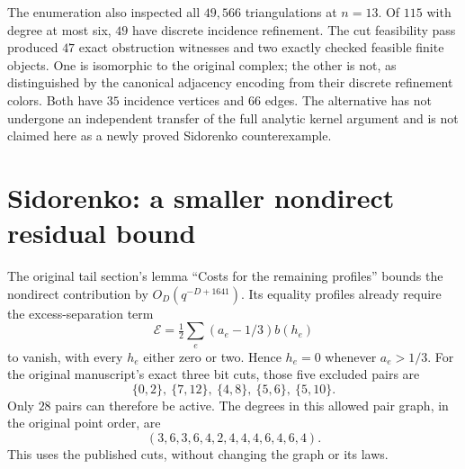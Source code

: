 \documentclass[11pt]{article}
\begin{document}
The enumeration also inspected all $49{,}566$ triangulations at $n=13$.
Of $115$ with degree at most six, $49$ have discrete incidence refinement.
The cut feasibility pass produced $47$ exact obstruction witnesses and
two exactly checked feasible finite objects. One is isomorphic to the
original complex; the other is not, as distinguished by the canonical
adjacency encoding from their discrete refinement colors. Both have
$35$ incidence vertices and $66$ edges. The alternative has not undergone
an independent transfer of the full analytic kernel argument and is not
claimed here as a newly proved Sidorenko counterexample.

\section{Sidorenko: a smaller nondirect residual bound}
\label{sec:residual-improvement}
The original tail section's lemma ``Costs for the remaining profiles''
bounds the nondirect contribution by $O_D(q^{-D+1641})$. Its equality
profiles already require the excess-separation term
\[
 \mathcal E=\tfrac12\sum_e(a_e-1/3)b(h_e)
\]
to vanish, with every $h_e$ either zero or two. Hence $h_e=0$ whenever
$a_e>1/3$. For the original manuscript's exact three bit cuts, those
five excluded pairs are
\[
 \{0,2\},\ \{7,12\},\ \{4,8\},\ \{5,6\},\ \{5,10\}.
\]
Only $28$ pairs can therefore be active. The degrees in this allowed
pair graph, in the original point order, are
\[
 (3,6,3,6,4,2,4,4,4,6,4,6,4).
\]
This uses the published cuts, without changing the graph or its laws.
\end{document}
